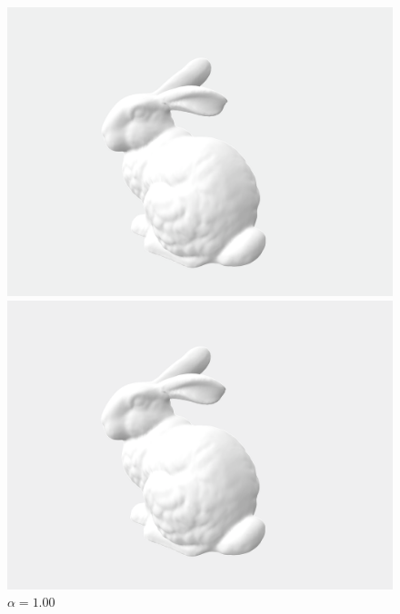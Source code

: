 \documentclass[lang=cn,11pt,a4paper]{elegantpaper}
\begin{document}
\begin{figure}[ht]
	\centering
	\begin{minipage}{0.45\linewidth}
		\centering
		\includegraphics[width=0.97\linewidth]{image/result_alpha_0.3.png}
		\caption{$\alpha = 0.30$}
	\end{minipage}
	\begin{minipage}{0.45\linewidth}
		\centering
		\includegraphics[width=0.97\linewidth]{image/result_alpha_1.0.png}
		\caption{$\alpha = 1.00$}
	\end{minipage}
	

\end{figure}
\end{document}
